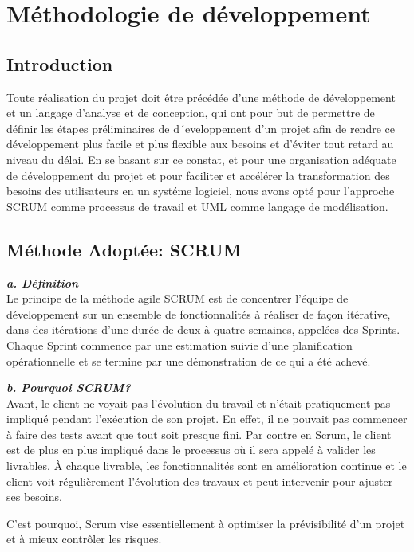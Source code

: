 \newpage
\section{Méthodologie de développement}
\subsection{Introduction}
\noindent
Toute réalisation du projet doit être précédée d’une méthode de développement et un langage d’analyse et de conception, qui ont pour but de permettre de définir les étapes préliminaires de d´eveloppement d’un projet afin de rendre ce développement plus facile et plus flexible aux besoins et d’éviter tout retard au niveau du délai. En se basant sur ce constat, et pour une organisation adéquate de développement du projet et pour faciliter et accélérer la transformation
des besoins des utilisateurs en un systéme logiciel, nous avons opté pour l’approche SCRUM comme processus de travail et UML comme langage de modélisation.

\subsection{Méthode Adoptée: SCRUM}
\noindent
{\small\textbf{\textit{a. Définition}}}\mbox{}\\
Le principe de la méthode agile SCRUM est de concentrer l'équipe de développement sur un ensemble de fonctionnalités à réaliser de façon itérative, dans des itérations d'une durée de deux à quatre semaines, appelées des Sprints. Chaque Sprint commence par une estimation suivie d'une planification opérationnelle et se termine par une démonstration de ce qui a été achevé.

\noindent
{\small\textbf{\textit{b. Pourquoi SCRUM?}}}\mbox{}\\
Avant, le client ne voyait pas l'évolution du travail et n'était pratiquement pas impliqué pendant l'exécution de son projet. En effet, il ne pouvait pas commencer à faire des tests avant que tout soit presque fini. Par contre en Scrum, le client est de plus en plus impliqué dans le processus où il sera appelé à valider les livrables. À chaque livrable, les fonctionnalités sont en amélioration continue et le client voit régulièrement l'évolution des travaux et peut intervenir pour ajuster ses besoins.

\noindent
C'est pourquoi, Scrum vise essentiellement à optimiser la prévisibilité d'un projet et à mieux contrôler les risques.


